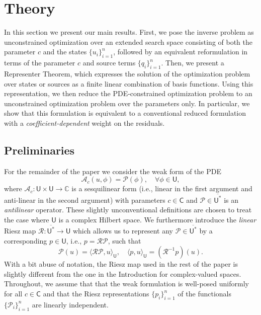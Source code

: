 \documentclass[12pt]{amsart}
\newcommand{\U}{\mathsf{U}}
\newcommand{\yy}[1]{\textcolor{blue}{{YY: #1}}}
\newcommand{\tvl}[1]{\textcolor{purple}{{TvL: #1}}}
\begin{document}
\section{Theory}\label{sec:theory}
In this section we present our main results. First, we pose the inverse problem as unconstrained optimization over an extended search space consisting of both the parameter $c$ and the states $\{u_i\}_{i=1}^n$, followed by an equivalent reformulation in terms of the parameter $c$ and source terms $\{q_i\}_{i=1}^n$. Then, we present a Representer Theorem, which expresses the solution of the optimization problem over states or sources as a finite linear combination of basis functions. Using this representation, we then reduce the PDE-constrained optimization problem to an unconstrained optimization problem over the parameters only. In particular, we show that this formulation is equivalent to a conventional reduced formulation with a \textit{coefficient-dependent} weight on the residuals.

\subsection{Preliminaries}
For the remainder of the paper we consider the weak form of the PDE
\begin{equation}\label{eq:weak}
\mathcal{A}_c(u, \phi) = \mathcal{P}(\phi), \quad \forall\phi\in \mathsf{U},
\end{equation}
where $\mathcal{A}_c:\mathsf{U}\times \mathsf{U} \rightarrow \mathbb{C}$ is a sesquilinear form (i.e., linear in the first argument and anti-linear in the second argument) with parameters $c \in \mathsf{C}$ and $\mathcal{P} \in \overline{\mathsf{U}^*}$ is an \emph{antilinear} operator. These slightly unconventional definitions are chosen to treat the case where $\mathsf{U}$ is a complex Hilbert space. We furthermore introduce the \emph{linear} Riesz map $\mathcal{R}:\overline{\mathsf{U}^*}\rightarrow \mathsf{U}$ which allows us to represent any $\mathcal{P}\in \overline{\mathsf{U}^*}$ by a corresponding $p\in\mathsf{U}$, i.e., $p = \mathcal{R}\mathcal{P}$, such that 
\[
\mathcal{P}(u) = \langle \mathcal{R}\mathcal{P}, u\rangle_{\mathsf{U}},\quad \langle p, u\rangle_{\mathsf{U}} = \left(\mathcal{R}^{-1}p\right)(u).
\]
With a bit abuse of notation, the Riesz map used in the rest of the paper is slightly different from the one in the Introduction for complex-valued spaces.
Throughout, we assume that  that the weak formulation is well-posed uniformly for all $c \in \mathsf{C}$ and that the Riesz representations $\{p_i\}_{i=1}^n$ of the functionals $\{\mathcal{P}_i\}_{i=1}^n$ are linearly independent.
\end{document}
